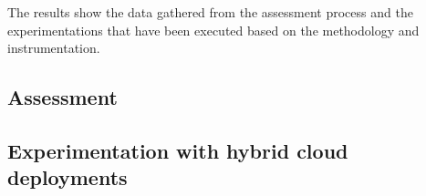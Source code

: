 \documentclass[../main.tex]{subfiles}
\begin{document}
    The results show the data gathered from the assessment process and the experimentations that have been executed based on the methodology and instrumentation.

    \subsection{Assessment}
    \label{subsec:res-asses}

    

    \subsection{Experimentation with hybrid cloud deployments}
    \label{subsec:res-experiment}

    
\end{document}
